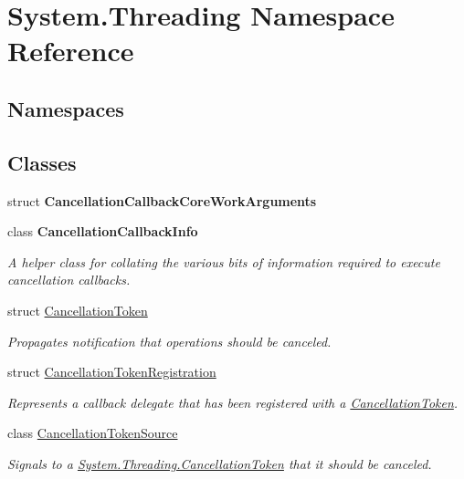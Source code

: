 \hypertarget{namespace_system_1_1_threading}{}\section{System.\+Threading Namespace Reference}
\label{namespace_system_1_1_threading}
\subsection*{Namespaces}
\begin{DoxyCompactItemize}
\end{DoxyCompactItemize}
\subsection*{Classes}
\begin{DoxyCompactItemize}
\item 
struct {\bfseries Cancellation\+Callback\+Core\+Work\+Arguments}
\item 
class {\bfseries Cancellation\+Callback\+Info}
\begin{DoxyCompactList}\small\item\em A helper class for collating the various bits of information required to execute cancellation callbacks. \end{DoxyCompactList}\item 
struct \hyperlink{struct_system_1_1_threading_1_1_cancellation_token}{Cancellation\+Token}
\begin{DoxyCompactList}\small\item\em Propagates notification that operations should be canceled. \end{DoxyCompactList}\item 
struct \hyperlink{struct_system_1_1_threading_1_1_cancellation_token_registration}{Cancellation\+Token\+Registration}
\begin{DoxyCompactList}\small\item\em Represents a callback delegate that has been registered with a \hyperlink{}{Cancellation\+Token}. \end{DoxyCompactList}\item 
class \hyperlink{class_system_1_1_threading_1_1_cancellation_token_source}{Cancellation\+Token\+Source}
\begin{DoxyCompactList}\small\item\em Signals to a \hyperlink{struct_system_1_1_threading_1_1_cancellation_token}{System.\+Threading.\+Cancellation\+Token} that it should be canceled. \end{DoxyCompactList}\item 

\end{DoxyCompactItemize}
